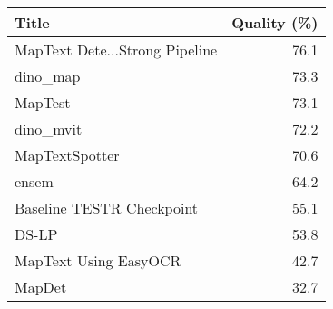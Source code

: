 \begin{tabular}{lr}
\toprule
Title & Quality (\%) \\
\midrule
MapText Dete...Strong Pipeline & 76.1 \\
dino_map & 73.3 \\
MapTest & 73.1 \\
dino_mvit & 72.2 \\
MapTextSpotter & 70.6 \\
ensem & 64.2 \\
Baseline TESTR Checkpoint & 55.1 \\
DS-LP & 53.8 \\
MapText Using EasyOCR & 42.7 \\
MapDet & 32.7 \\
\bottomrule
\end{tabular}
